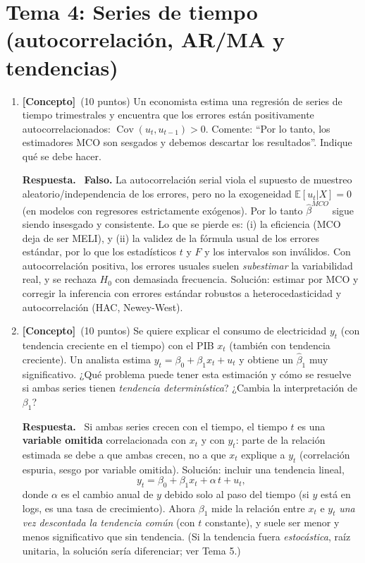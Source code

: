 \documentclass[12pt,letterpaper]{article}
\DeclareMathOperator{\cov}{Cov}
\newcommand{\E}[1]{\mathbb{E}\left[#1\right]}
\newenvironment{resp}{\begingroup\color{blue}\par\noindent\textbf{Respuesta.}\ }{\par\endgroup}
\newcommand{\tema}[1]{\section*{#1}}
\newcommand{\conc}{\textbf{[Concepto]}}
\begin{document}
\newpage
\tema{Tema 4: Series de tiempo (autocorrelación, AR/MA y tendencias)}

\begin{enumerate}[1.]

\item \conc\ (10 puntos) Un economista estima una regresión de series de tiempo trimestrales y encuentra que los errores están positivamente autocorrelacionados: $\cov(u_t,u_{t-1})>0$. Comente: ``Por lo tanto, los estimadores MCO son sesgados y debemos descartar los resultados''. Indique qué se debe hacer.

\begin{resp}
\textbf{Falso.} La autocorrelación serial viola el supuesto de muestreo aleatorio/independencia de los errores, pero no la exogeneidad $\E{u_t|X}=0$ (en modelos con regresores estrictamente exógenos). Por lo tanto $\hat\beta^{MCO}$ sigue siendo insesgado y consistente. Lo que se pierde es: (i) la eficiencia (MCO deja de ser MELI), y (ii) la validez de la fórmula usual de los errores estándar, por lo que los estadísticos $t$ y $F$ y los intervalos son inválidos. Con autocorrelación positiva, los errores usuales suelen \emph{subestimar} la variabilidad real, y se rechaza $H_0$ con demasiada frecuencia. Solución: estimar por MCO y corregir la inferencia con errores estándar robustos a heterocedasticidad y autocorrelación (HAC, Newey-West).
\end{resp}

\item \conc\ (10 puntos) Se quiere explicar el consumo de electricidad $y_t$ (con tendencia creciente en el tiempo) con el PIB $x_t$ (también con tendencia creciente). Un analista estima $y_t=\beta_0+\beta_1x_t+u_t$ y obtiene un $\hat\beta_1$ muy significativo. ¿Qué problema puede tener esta estimación y cómo se resuelve si ambas series tienen \emph{tendencia determinística}? ¿Cambia la interpretación de $\beta_1$?

\begin{resp}
Si ambas series crecen con el tiempo, el tiempo $t$ es una \textbf{variable omitida} correlacionada con $x_t$ y con $y_t$: parte de la relación estimada se debe a que ambas crecen, no a que $x_t$ explique a $y_t$ (correlación espuria, sesgo por variable omitida). Solución: incluir una tendencia lineal,
\[
y_t=\beta_0+\beta_1x_t+\alpha\,t+u_t ,
\]
donde $\alpha$ es el cambio anual de $y$ debido solo al paso del tiempo (si $y$ está en logs, es una tasa de crecimiento). Ahora $\beta_1$ mide la relación entre $x_t$ e $y_t$ \emph{una vez descontada la tendencia común} (con $t$ constante), y suele ser menor y menos significativo que sin tendencia. (Si la tendencia fuera \emph{estocástica}, raíz unitaria, la solución sería diferenciar; ver Tema 5.)
\end{resp}


\end{enumerate}
\end{document}
